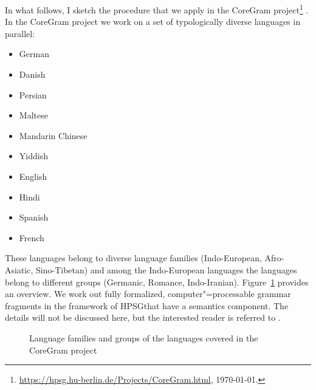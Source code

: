 In what follows, I sketch the procedure that we apply in the CoreGram project\footnote{%
\url{https://hpsg.hu-berlin.de/Projects/CoreGram.html}, \today.
} \citep{MuellerCoreGramBrief,MuellerCoreGram}. In the CoreGram project we work on a set of
typologically diverse languages in parallel:
\begin{itemize}
\item German  \citep{MuellerLehrbuch1,MuellerPredication,MuellerCopula,MOe2011a,MOe2013a,MuellerArten,MuellerGS}
\item Danish  \citep{Oersnes2009a,MuellerPredication,MuellerCopula,MOe2011a,MOe2013a,MOe2013b,MOeDanish}
\item Persian \citep*{MuellerPersian,MG2010a}
\item Maltese \citep{MuellerMalteseSketch}
\item Mandarin Chinese \citep{Lipenkova2009a,ML2009a,ML2013a,MLChinese}
\item Yiddish \citep{MOe2011a}
\item English \citep{MuellerPredication,MuellerCopula,MOe2013a}
\item Hindi
\item Spanish \citep{Machicao-y-Priemer2015a}
\item French
\end{itemize}

\noindent
These languages belong to diverse language families 
(Indo-European, %
 Afro-Asiatic,  %
 Sino-Tibetan) %
and among the Indo-European languages the languages belong to different groups (Germanic, Romance,
Indo-Iranian). Figure~\ref{fig-lang-fams} provides an overview.
%
We work out fully formalized, computer"=processable grammar fragments in the framework of
HPSG\indexhpsg that have a semantics component. The details will not be discussed here, but the
interested reader is referred to . 
\begin{figure}
\caption{Language families and groups of the languages covered in the CoreGram project}\label{fig-lang-fams}
\end{figure}%

